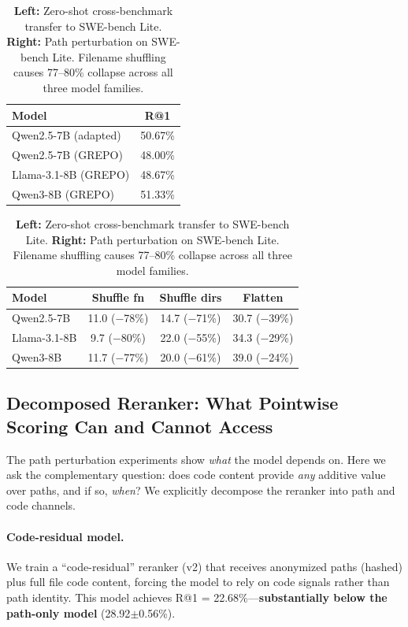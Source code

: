 \documentclass{article}
\begin{document}
\begin{table}[t]
\centering
\caption{\textbf{Left:} Zero-shot cross-benchmark transfer to SWE-bench Lite. \textbf{Right:} Path perturbation on SWE-bench Lite. Filename shuffling causes 77--80\% collapse across all three model families.}
\label{tab:zero_shot_transfer}
\label{tab:swebench_perturb}
\small
\begin{minipage}[t]{0.38\textwidth}
\centering
\begin{tabular}{lc}
\toprule
\textbf{Model} & \textbf{R@1} \\
\midrule
Qwen2.5-7B (adapted) & 50.67\% \\
Qwen2.5-7B (GREPO) & 48.00\% \\
Llama-3.1-8B (GREPO) & 48.67\% \\
Qwen3-8B (GREPO) & 51.33\% \\
\bottomrule
\end{tabular}
\end{minipage}
\hfill
\begin{minipage}[t]{0.58\textwidth}
\centering
\begin{tabular}{lccc}
\toprule
\textbf{Model} & \textbf{Shuffle fn} & \textbf{Shuffle dirs} & \textbf{Flatten} \\
\midrule
Qwen2.5-7B & 11.0 ($-$78\%) & 14.7 ($-$71\%) & 30.7 ($-$39\%) \\
Llama-3.1-8B & 9.7 ($-$80\%) & 22.0 ($-$55\%) & 34.3 ($-$29\%) \\
Qwen3-8B & 11.7 ($-$77\%) & 20.0 ($-$61\%) & 39.0 ($-$24\%) \\
\bottomrule
\end{tabular}
\end{minipage}
\end{table}


\subsection{Decomposed Reranker: What Pointwise Scoring Can and Cannot Access}
\label{sec:decomposed_reranker}

The path perturbation experiments show \emph{what} the model depends on.
Here we ask the complementary question: does code content provide \emph{any} additive value over paths, and if so, \emph{when}?
We explicitly decompose the reranker into path and code channels.

\paragraph{Code-residual model.}
We train a ``code-residual'' reranker (v2) that receives anonymized paths (hashed) plus full file code content, forcing the model to rely on code signals rather than path identity.
This model achieves R@1 = 22.68\%---\textbf{substantially below the path-only model} (28.92$\pm$0.56\%).
\end{document}

